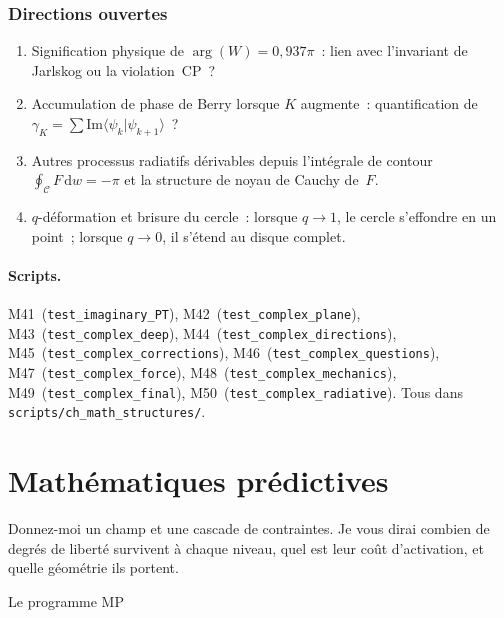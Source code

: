 \documentclass[12pt,a4paper]{article}
\begin{document}
\subsubsection{Directions ouvertes}
\label{subsec:cx_open}

\begin{enumerate}[nosep]
\item Signification physique de $\arg(W) = 0{,}937\pi$~: lien avec
  l'invariant de Jarlskog ou la violation~CP~?
\item Accumulation de phase de Berry lorsque $K$ augmente~:
  quantification de
  $\gamma_K = \sum \mathrm{Im}\langle\psi_k|\psi_{k+1}\rangle$~?
\item Autres processus radiatifs dérivables depuis l'intégrale de
  contour $\oint_{\mathcal{C}} F\,\mathrm{d}w = -\pi$ et la structure
  de noyau de Cauchy de~$F$.
\item $q$-déformation et brisure du cercle~: lorsque $q \to 1$, le
  cercle s'effondre en un point~; lorsque $q \to 0$, il s'étend au
  disque complet.
\end{enumerate}


\paragraph{Scripts.}
M41~(\texttt{test\_imaginary\_PT}),
M42~(\texttt{test\_complex\_plane}),
M43~(\texttt{test\_complex\_deep}),
M44~(\texttt{test\_complex\_directions}),
M45~(\texttt{test\_complex\_corrections}),
M46~(\texttt{test\_complex\_questions}),
M47~(\texttt{test\_complex\_force}),
M48~(\texttt{test\_complex\_mechanics}),
M49~(\texttt{test\_complex\_final}),
M50~(\texttt{test\_complex\_radiative}).
Tous dans \texttt{scripts/ch\_math\_structures/}.


\newpage

\section{Mathématiques prédictives}
\label{sec:PM}

\epigraph{Donnez-moi un champ et une cascade de contraintes. Je vous
dirai combien de degrés de liberté survivent à chaque niveau, quel
est leur coût d'activation, et quelle géométrie ils portent.}{Le
programme MP}
\end{document}
